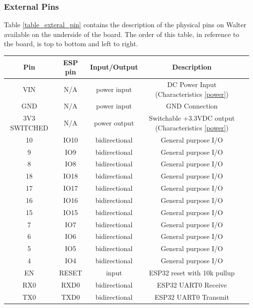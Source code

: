 \documentclass[11pt]{article}
\begin{document}
\subsubsection{External Pins} \label{external_pins}
Table \ref{table_exteral_pin} contains the description of the physical pins on Walter available on the underside of the board. \newline
The order of this table, in reference to the board, is top to bottom and left to right.\newline
\renewcommand{\arraystretch}{1.5}
\begin{table}[!h]
\begin{center}
\begin{tabular}{|c|c|c|c|p{9.5cm}|}
\hline
{\bf Pin} & \multicolumn{1}{c|}{\bf ESP pin} & \multicolumn{1}{c|}{\bf Input/Output} & \multicolumn{1}{c|}{\bf Description} \\
\hline
\hline
VIN & N/A & power input & DC Power Input (Characteristics \ref{power})\\
\hline
GND & N/A & power input & GND Connection \\
\hline
3V3 SWITCHED & N/A & power output & Switchable +3.3VDC output (Characteristics \ref{power}) \\
\hline
10 & IO10 & bidirectional & General purpose I/O \\
\hline
9 & IO9 & bidirectional & General purpose I/O \\
\hline
8 & IO8 & bidirectional & General purpose I/O \\
\hline
18 & IO18 & bidirectional & General purpose I/O \\
\hline
17 & IO17 & bidirectional & General purpose I/O \\
\hline
16 & IO16 & bidirectional & General purpose I/O \\
\hline
15 & IO15 & bidirectional & General purpose I/O \\
\hline
7 & IO7 & bidirectional & General purpose I/O \\
\hline
6 & IO6 & bidirectional & General purpose I/O \\
\hline
5 & IO5 & bidirectional & General purpose I/O \\
\hline
4 & IO4 & bidirectional & General purpose I/O \\
\hline
EN & RESET & input & ESP32 reset with 10k pullup \\
\hline
RX0 & RXD0 & bidirectional & ESP32 UART0 Receive \\
\hline
TX0 & TXD0 & bidirectional & ESP32 UART0 Transmit \\

\end{tabular}
\end{center}
\end{table}
\end{document}
